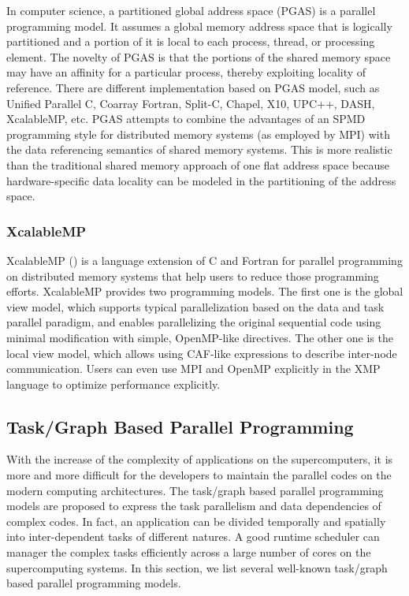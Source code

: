 In computer science, a partitioned global address space (PGAS) is a parallel programming model. It assumes a global memory address space that is logically partitioned and a portion of it is local to each process, thread, or processing element. The novelty of PGAS is that the portions of the shared memory space may have an affinity for a particular process, thereby exploiting locality of reference. There are different implementation based on PGAS model, such as Unified Parallel C, Coarray Fortran, Split-C, Chapel, X10, UPC++, DASH, XcalableMP, etc. PGAS attempts to combine the advantages of an SPMD programming style for distributed memory systems (as employed by MPI) with the data referencing semantics of shared memory systems. This is more realistic than the traditional shared memory approach of one flat address space because hardware-specific data locality can be modeled in the partitioning of the address space.

\subsubsection{XcalableMP}

XcalableMP (\cite{lee2010implementation}) is a language extension of C and Fortran for parallel programming on distributed memory systems that help users to reduce those programming efforts. XcalableMP provides two programming models. The first one is the global view model, which supports typical parallelization based on the data and task parallel paradigm, and enables parallelizing the original sequential code using minimal modification with simple, OpenMP-like directives. The other one is the local view model, which allows using CAF-like expressions to describe inter-node communication. Users can even use MPI and OpenMP explicitly in the XMP language to optimize performance explicitly.

\subsection{Task/Graph Based Parallel Programming}

With the increase of the complexity of applications on the supercomputers, it is more and more difficult for the developers to maintain the parallel codes on the modern computing architectures. The task/graph based parallel programming models are proposed to express the task parallelism and data dependencies of complex codes. In fact, an application can be divided temporally and spatially into inter-dependent tasks of different natures. A good runtime scheduler can manager the complex tasks efficiently across a large number of cores on the supercomputing systems. In this section, we list several well-known task/graph based parallel programming models.

